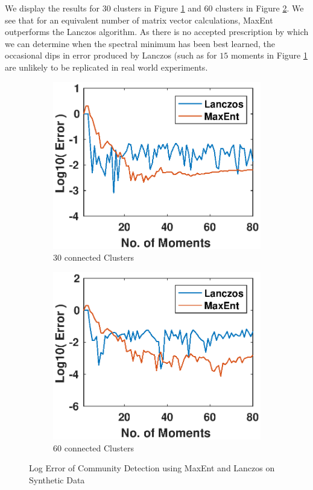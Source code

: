 \documentclass{article}
\begin{document}
We display the results for $30$ clusters in Figure \ref{fig:sub3} and $60$ clusters in Figure \ref{fig:sub4}. We see that for an equivalent number of matrix vector calculations, MaxEnt outperforms the Lanczos algorithm. As there is no accepted prescription by which we can determine when the spectral minimum has been best learned, the occasional dips in error produced by Lanczos (such as for $15$ moments in Figure \ref{fig:sub3} are unlikely to be replicated in real world experiments.
\begin{figure}[t]
	\centering
	\begin{subfigure}{.5\linewidth}
		\centering
		\includegraphics[trim=0.5cm 0.2cm 1cm 0.8cm, clip, width=1.0\linewidth]{Figures/Error_for_Synall3type_connected30}
		\caption{$30$ connected Clusters}
		\label{fig:sub3}
	\end{subfigure}%
	\begin{subfigure}{.5\linewidth}
		\centering
		\includegraphics[trim=0.5cm 0.2cm 1cm 0.8cm, clip, width=1.0\linewidth]{Figures/Error_for_Synall3type_connected60}
		\caption{$60$ connected Clusters}
		\label{fig:sub4}
	\end{subfigure}
	\caption{Log Error of Community Detection using MaxEnt and Lanczos on Synthetic Data}
	\label{fig:test}
\end{figure}
\end{document}
